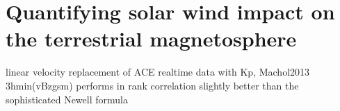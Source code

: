 % 
% 
% 
% 
% 
% 
% 
% 


\section{Quantifying solar wind impact on the terrestrial magnetosphere}

linear velocity replacement of ACE realtime data with Kp, Machol2013\\

3hmin(vBzgsm) performs in rank correlation slightly better than the sophisticated Newell formula\\

